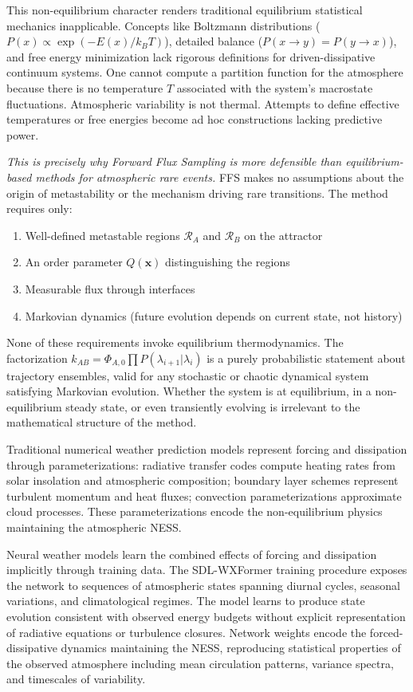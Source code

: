 \documentclass[11pt]{article}
\begin{document}
This non-equilibrium character renders traditional equilibrium statistical mechanics inapplicable. Concepts like Boltzmann distributions ($P(x) \propto \exp(-E(x)/k_BT)$), detailed balance ($P(x \to y) = P(y \to x)$), and free energy minimization lack rigorous definitions for driven-dissipative continuum systems. One cannot compute a partition function for the atmosphere because there is no temperature $T$ associated with the system's macrostate fluctuations. Atmospheric variability is not thermal. Attempts to define effective temperatures or free energies become ad hoc constructions lacking predictive power.

\textit{This is precisely why Forward Flux Sampling is more defensible than equilibrium-based methods for atmospheric rare events.} FFS makes no assumptions about the origin of metastability or the mechanism driving rare transitions. The method requires only:

\begin{enumerate}
    \item Well-defined metastable regions $\mathcal{R}_A$ and $\mathcal{R}_B$ on the attractor
    \item An order parameter $Q(\mathbf{x})$ distinguishing the regions
    \item Measurable flux through interfaces
    \item Markovian dynamics (future evolution depends on current state, not history)
\end{enumerate}

None of these requirements invoke equilibrium thermodynamics. The factorization $k_{AB} = \Phi_{A,0} \prod P(\lambda_{i+1}|\lambda_i)$ is a purely probabilistic statement about trajectory ensembles, valid for any stochastic or chaotic dynamical system satisfying Markovian evolution. Whether the system is at equilibrium, in a non-equilibrium steady state, or even transiently evolving is irrelevant to the mathematical structure of the method.

Traditional numerical weather prediction models represent forcing and dissipation through parameterizations: radiative transfer codes compute heating rates from solar insolation and atmospheric composition; boundary layer schemes represent turbulent momentum and heat fluxes; convection parameterizations approximate cloud processes. These parameterizations encode the non-equilibrium physics maintaining the atmospheric NESS.

Neural weather models learn the combined effects of forcing and dissipation implicitly through training data. The SDL-WXFormer training procedure exposes the network to sequences of atmospheric states spanning diurnal cycles, seasonal variations, and climatological regimes. The model learns to produce state evolution consistent with observed energy budgets without explicit representation of radiative equations or turbulence closures. Network weights encode the forced-dissipative dynamics maintaining the NESS, reproducing statistical properties of the observed atmosphere including mean circulation patterns, variance spectra, and timescales of variability.
\end{document}

